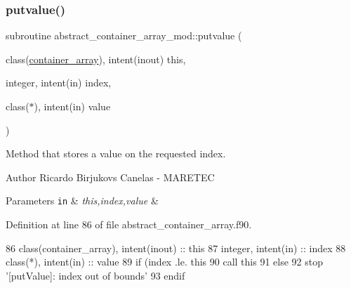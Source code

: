 \subsubsection{\texorpdfstring{putvalue()}{putvalue()}}
{\footnotesize\ttfamily subroutine abstract\+\_\+container\+\_\+array\+\_\+mod\+::putvalue (\begin{DoxyParamCaption}\item[{class(\mbox{\hyperlink{structabstract__container__array__mod_1_1container__array}{container\+\_\+array}}), intent(inout)}]{this,  }\item[{integer, intent(in)}]{index,  }\item[{class($\ast$), intent(in)}]{value }\end{DoxyParamCaption})\hspace{0.3cm}{\ttfamily [private]}}



Method that stores a value on the requested index. 

\begin{DoxyAuthor}{Author}
Ricardo Birjukovs Canelas -\/ M\+A\+R\+E\+T\+EC 
\end{DoxyAuthor}

\begin{DoxyParams}[1]{Parameters}
\mbox{\tt in}  & {\em this,index,value} & \\
\hline
\end{DoxyParams}


Definition at line 86 of file abstract\+\_\+container\+\_\+array.\+f90.


\begin{DoxyCode}
86     \textcolor{keywordtype}{class}(container\_array), \textcolor{keywordtype}{intent(inout)} :: this
87     \textcolor{keywordtype}{integer}, \textcolor{keywordtype}{intent(in)} :: index
88     \textcolor{keywordtype}{class}(*), \textcolor{keywordtype}{intent(in)} :: value
89     \textcolor{keywordflow}{if} (index .le. this%
90         \textcolor{keyword}{call }this%
91     \textcolor{keywordflow}{else}
92         stop \textcolor{stringliteral}{'[putValue]: index out of bounds'}
93 \textcolor{keywordflow}{    endif}
\end{DoxyCode}
\mbox{\label{namespaceabstract__container__array__mod_adb5b2e1692fa90a0239e9a0bcdc7967d}} 
